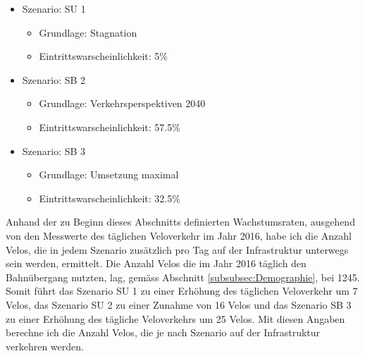 \begin{itemize}
\item Szenario: SU 1
	\begin{itemize}
	\item Grundlage: Stagnation 
	\item Eintrittswarscheinlichkeit: 5\%
	\end{itemize}
\item Szenario: SB 2
	\begin{itemize}
	\item Grundlage: Verkehrsperspektiven 2040
	\item Eintrittswarscheinlichkeit: 57.5\%
	\end{itemize}
\item Szenario: SB 3
	\begin{itemize}
	\item Grundlage: Umsetzung maximal
	\item Eintrittswarscheinlichkeit: 32.5\%
	\end{itemize}
\end{itemize}

Anhand der zu Beginn dieses Abschnitts definierten Wachstumsraten, ausgehend von den Messwerte des täglichen Veloverkehr im Jahr 2016, habe ich die Anzahl Velos, die in jedem Szenario zusätzlich pro Tag auf der Infrastruktur unterwegs sein werden, ermittelt. Die Anzahl Velos die im Jahr 2016 täglich den Bahnübergang nutzten, lag, gemäss Abschnitt \ref{subsubsec:Demographie}, bei 1245.
Somit führt das Szenario SU 1 zu einer Erhöhung des täglichen Veloverkehr um 7 Velos, das Szenario SU 2 zu einer Zunahme von 16 Velos und das Szenario SB 3 zu einer Erhöhung des tägliche Veloverkehrs um 25 Velos. 
Mit diesen Angaben berechne ich die Anzahl Velos, die je nach Szenario auf der Infrastruktur verkehren werden.

%

